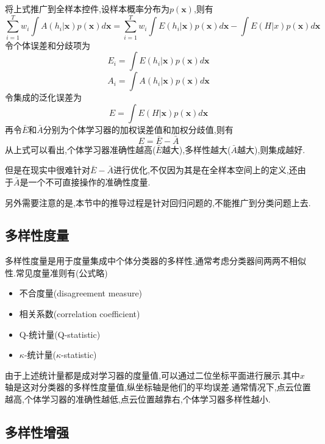 将上式推广到全样本控件,设样本概率分布为$p(\mathbf{x})$,则有
\begin{equation}
\sum_{i=1}^Tw_i\int A(h_i|\mathbf{x})p(\mathbf{x})d\mathbf{x}=\sum_{i=1}^Tw_i\int E(h_i|\mathbf{x})p(\mathbf{x})d\mathbf{x}-\int E(H|x)p(\mathbf{x})d\mathbf{x}
\end{equation}
令个体误差和分歧项为
\begin{equation}
E_i=\int E(h_i|\mathbf{x})p(\mathbf{x})d\mathbf{x}
\end{equation}
\begin{equation}
A_i=\int A(h_i|\mathbf{x})p(\mathbf{x})d\mathbf{x}
\end{equation}
令集成的泛化误差为
\begin{equation}
E=\int E(H|\mathbf{x})p(\mathbf{x})d\mathbf{x}
\end{equation}
再令$\bar{E}$和$\bar{A}$分别为个体学习器的加权误差值和加权分歧值,则有
\begin{equation}
E=\bar{E}-\bar{A}
\end{equation}
从上式可以看出,个体学习器准确性越高($\bar{E}$越大),多样性越大($\bar{A}$越大),则集成越好.

但是在现实中很难针对$\bar{E}-\bar{A}$进行优化,不仅因为其是在全样本空间上的定义,还由于$\bar{A}$是一个不可直接操作的准确性度量.

另外需要注意的是,本节中的推导过程是针对回归问题的,不能推广到分类问题上去.

\subsection{多样性度量}

多样性度量是用于度量集成中个体分类器的多样性,通常考虑分类器间两两不相似性.常见度量准则有(公式略)
\begin{itemize}
\item 不合度量(disagreement measure)
\item 相关系数(correlation coefficient)
\item Q-统计量(Q-statistic)
\item $\kappa$-统计量($\kappa$-statistic)
\end{itemize}

由于上述统计量都是成对学习器的度量值,可以通过二位坐标平面进行展示.其中$x$轴是这对分类器的多样性度量值,纵坐标轴是他们的平均误差.通常情况下,点云位置越高,个体学习器的准确性越低,点云位置越靠右,个体学习器多样性越小.

\subsection{多样性增强}

